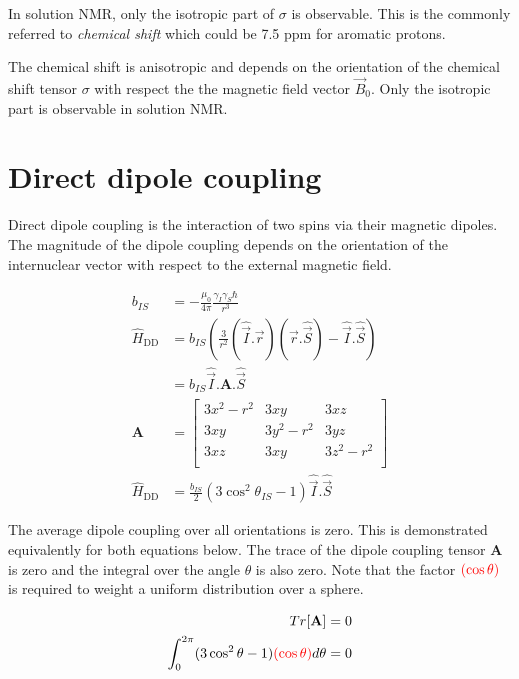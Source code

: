 \documentclass[11pt]{article}
\theoremstyle{definition}
\begin{document}
In solution NMR, only the isotropic part of $\sigma$ is observable. This is the commonly referred to \emph{chemical shift} which could be 7.5 ppm for aromatic protons.

\begin{shaded}
	The chemical shift is anisotropic and depends on the orientation of the chemical shift tensor $\sigma$ with respect the the magnetic field vector $\vec B_0$. Only the isotropic part is observable in solution NMR.
\end{shaded}

\section{Direct dipole coupling}
Direct dipole coupling is the interaction of two spins via their magnetic dipoles. The magnitude of the dipole coupling depends on the orientation of the internuclear vector with respect to the external magnetic field. 

\begin{align}
	b_{IS} &=-\frac{\mu_0}{4\pi}\frac{\gamma_I \gamma_S \hbar}{r^3} \\
	\hat H_\text{DD}&=b_{IS}
	\left
		(\frac{3}{r^2} (\hat{\vec I}.\vec r)(\vec r.\hat{\vec S}) - \hat{\vec I}.\hat{\vec S}
	\right)\\
	&=b_{IS}\hat{\vec I}.\mathbf{A}.\hat{\vec S}\\
	\mathbf{A}&=
	\begin{bmatrix}
		3x^2-r^2 & 3xy & 3xz\\
		3xy & 3y^2-r^2 & 3yz\\
		3xz & 3xy & 3z^2-r^2\\
	\end{bmatrix}\\
	\hat H_\text{DD}&=\frac{b_{IS}}{2}\left(3\cos^2{\theta_{IS}-1} \right)\hat{\vec I}.\hat{\vec S}
\end{align}

The average dipole coupling over all orientations is zero. This is demonstrated equivalently for both equations below. The trace of the dipole coupling tensor $\mathbf{A}$ is zero and the integral over the angle $\theta$ is also zero. Note that the factor ${\color{red}(\cos{\theta})}$ is required to weight a uniform distribution over a sphere.

\begin{align}
	Tr[\mathbf{A}] &= 0\\
	\int_0^{2\pi}(3\cos^2{\theta}-1){\color{red}(\cos{\theta})}d\theta &= 0
\end{align}
\end{document}
